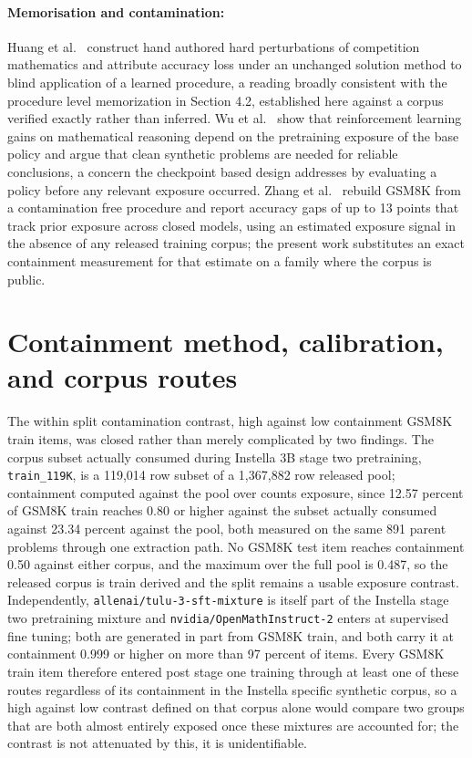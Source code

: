 \documentclass{article}
\begin{document}
\paragraph{Memorisation and contamination:} Huang et al.~\citep{huang2025mathperturb}
construct hand authored hard perturbations of competition mathematics and attribute accuracy
loss under an unchanged solution method to blind application of a learned procedure, a
reading broadly consistent with the procedure level memorization in Section 4.2, established
here against a corpus verified exactly rather than inferred. Wu et
al.~\citep{wu2025reasoning} show that reinforcement learning gains on mathematical reasoning
depend on the pretraining exposure of the base policy and argue that clean synthetic problems
are needed for reliable conclusions, a concern the checkpoint based design addresses by
evaluating a policy before any relevant exposure occurred. Zhang et
al.~\citep{zhang2024careful} rebuild GSM8K from a contamination free procedure and report
accuracy gaps of up to 13 points that track prior exposure across closed models, using an
estimated exposure signal in the absence of any released training corpus; the present work
substitutes an exact containment measurement for that estimate on a family where the corpus
is public.

\section{Containment method, calibration, and corpus routes}
\label{app:containment}

The within split contamination contrast, high against low containment GSM8K train
items, was closed rather than merely complicated by two findings. The corpus subset
actually consumed during Instella 3B stage two pretraining, \texttt{train\_119K}, is a
119{,}014 row subset of a 1{,}367{,}882 row released pool; containment computed against
the pool over counts exposure, since 12.57 percent of GSM8K train reaches 0.80 or
higher against the subset actually consumed against 23.34 percent against the pool, both
measured on the same 891 parent problems through one extraction path. No GSM8K test item
reaches containment 0.50 against either corpus, and the maximum over the full pool is
0.487, so the released corpus is train derived and the split remains a usable exposure
contrast.
Independently, \texttt{allenai/tulu-3-sft-mixture} is itself part of the Instella stage
two pretraining mixture and \texttt{nvidia/OpenMathInstruct-2} enters at supervised fine
tuning; both are generated in part from GSM8K train, and both carry it at containment
0.999 or higher on more than 97 percent of items. Every GSM8K train item therefore
entered post stage one training through at least one of these routes regardless of its
containment in the Instella specific synthetic corpus, so a high against low contrast
defined on that corpus alone would compare two groups that are both almost entirely
exposed once these mixtures are accounted for; the contrast is not attenuated by this,
it is unidentifiable.
\end{document}
